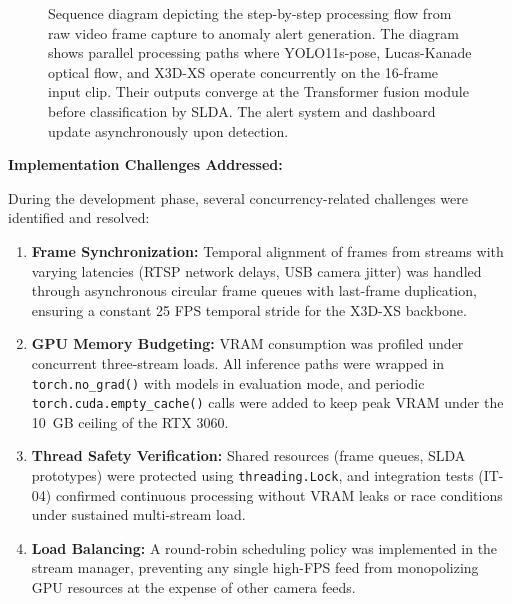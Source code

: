 \documentclass[12pt]{article}
\begin{document}
\begin{figure}[H]
{
    }%
    \caption{Sequence diagram depicting the step-by-step processing flow from raw video frame capture to anomaly alert generation. The diagram shows parallel processing paths where YOLO11s-pose, Lucas-Kanade optical flow, and X3D-XS operate concurrently on the 16-frame input clip. Their outputs converge at the Transformer fusion module before classification by SLDA. The alert system and dashboard update asynchronously upon detection.}
    \label{fig:sequence_diagram}
\end{figure}



\textbf{Implementation Challenges Addressed:}

During the development phase, several concurrency-related challenges were identified and resolved:

\begin{enumerate}
    \item \textbf{Frame Synchronization:} Temporal alignment of frames from streams with varying latencies (RTSP network delays, USB camera jitter) was handled through asynchronous circular frame queues with last-frame duplication, ensuring a constant 25 FPS temporal stride for the X3D-XS backbone.
    
    \item \textbf{GPU Memory Budgeting:} VRAM consumption was profiled under concurrent three-stream loads. All inference paths were wrapped in \texttt{torch.no\_grad()} with models in evaluation mode, and periodic \texttt{torch.cuda.empty\_cache()} calls were added to keep peak VRAM under the 10~GB ceiling of the RTX 3060.
    
    \item \textbf{Thread Safety Verification:} Shared resources (frame queues, SLDA prototypes) were protected using \texttt{threading.Lock}, and integration tests (IT-04) confirmed continuous processing without VRAM leaks or race conditions under sustained multi-stream load.
    
    \item \textbf{Load Balancing:} A round-robin scheduling policy was implemented in the stream manager, preventing any single high-FPS feed from monopolizing GPU resources at the expense of other camera feeds.
\end{enumerate}
\end{document}
